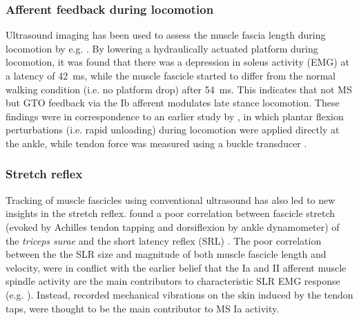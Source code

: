 \subsubsection{Afferent feedback during locomotion}
Ultrasound imaging has been used to assess the muscle fascia length during locomotion by e.g. \citeauthor{klint_afferent_2009} \cite{klint_afferent_2009}. By lowering a hydraulically actuated platform during locomotion, it was found that there was a depression in soleus activity (EMG) at a latency of \SI{42}{\milli\second}, while the muscle fascicle started to differ from the normal walking condition (i.e. no platform drop) after \SI{54}{\milli\second}. This indicates that not MS but GTO feedback via the Ib afferent modulates late stance locomotion. These findings were in correspondence to an earlier study by \citeauthor{grey_positive_2007}, in which plantar flexion perturbations (i.e. rapid unloading) during locomotion were applied directly at the ankle, while tendon force was measured using a buckle transducer \cite{grey_positive_2007}. 



\subsubsection{Stretch reflex}
Tracking of muscle fascicles using conventional ultrasound has also led to new insights in the stretch reflex. \citeauthor{cronin_triceps_2015} found a poor correlation between fascicle stretch (evoked by Achilles tendon tapping and dorsiflexion by ankle dynamometer) of the \textit{triceps surae} and the short latency reflex (SRL) \cite{cronin_triceps_2015}. The poor correlation between the the SLR size and magnitude of both muscle fascicle length and velocity, were in conflict with the earlier belief that the Ia and II afferent muscle spindle activity are the main contributors to characteristic SLR EMG response (e.g. \cite{schuurmans_monosynaptic_2009}). Instead, recorded mechanical vibrations on the skin induced by the tendon taps, were thought to be the main contributor to MS Ia activity. %




